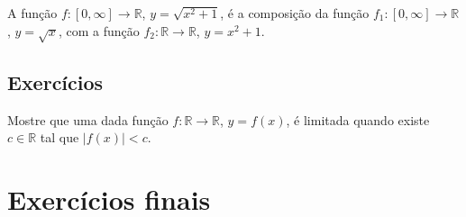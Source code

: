 \begin{ex}
  A função $f:[0, \infty]\to\mathbb{R}$, $y=\sqrt{x^2 + 1}$, é a composição da função $f_1:[0, \infty]\to\mathbb{R}$, $y = \sqrt{x}$, com a função $f_2:\mathbb{R}\to\mathbb{R}$, $y = x^2+1$.
\end{ex}

\subsection*{Exercícios}

\begin{exer}
  Mostre que uma dada função $f:\mathbb{R}\to\mathbb{R}$, $y = f(x)$, é limitada quando existe $c\in\mathbb{R}$ tal que $|f(x)|<c$.
\end{exer}

\section{Exercícios finais}

\construirExer
